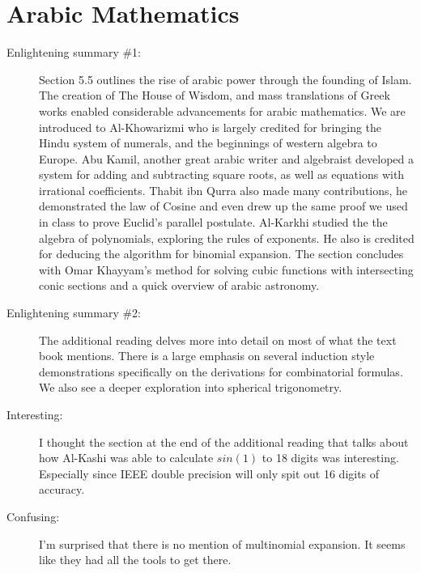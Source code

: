 \documentclass[12pt]{article}
\theoremstyle{homework}
\begin{document}
\section*{Arabic Mathematics}

\begin{description}
\item[Enlightening summary \#1:] Section 5.5 outlines the rise of arabic power through the founding of Islam. 
The creation of The House of Wisdom, and mass translations of Greek works enabled considerable advancements for arabic mathematics.
We are introduced to Al-Khowarizmi who is largely credited for bringing the Hindu system of numerals, and the beginnings of western algebra to Europe. Abu Kamil,
another great arabic writer and algebraist developed a system for adding and subtracting square roots, as well as equations with irrational coefficients. Thabit ibn Qurra also made 
many contributions, he demonstrated the law of Cosine and even drew up the same proof we used in class to prove Euclid's parallel postulate. Al-Karkhi studied the 
the algebra of polynomials, exploring the rules of exponents. He also is credited for deducing the algorithm for binomial expansion. The section concludes with Omar Khayyam's
method for solving cubic functions with intersecting conic sections and a quick overview of arabic astronomy. 

\item[Enlightening summary \#2:] The additional reading delves more into detail on most of what the text book mentions. There is a 
large emphasis on several induction style demonstrations specifically on the derivations for combinatorial formulas. We also see 
a deeper exploration into spherical trigonometry.   


\item[Interesting:]  I thought the section at the end of the additional reading that talks about how Al-Kashi was able to calculate $sin(1)$
to 18 digits was interesting. Especially since IEEE double precision will only spit out 16 digits of accuracy. 
 
\item[Confusing:] I'm surprised that there is no mention of multinomial expansion. It seems like they had all the tools to get there. 
 
\end{description}
\end{document}
